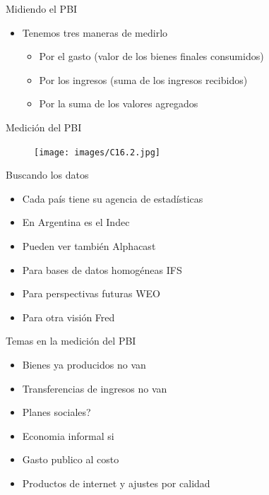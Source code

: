 \documentclass{beamer}
\begin{document}
\begin{frame}{Midiendo el PBI}
    \begin{itemize}
        \item Tenemos tres maneras de medirlo
       \begin{itemize}
           \item Por el gasto (valor de los bienes finales consumidos)
           \item Por los ingresos (suma de los ingresos recibidos)
           \item Por la suma de los valores agregados 
       \end{itemize}
    \end{itemize}
\end{frame}

\begin{frame}{Medición del PBI}
    \begin{figure} [H]   \texttt{[image: images/C16.2.jpg]}
\label{fig:25.2}
\end{figure}

\end{frame}



\begin{frame}{Buscando los datos}
    \begin{itemize}
        \item Cada país tiene su agencia de estadísticas
        \item En Argentina es el Indec
        \item Pueden ver también Alphacast
        \item Para bases de datos homogéneas IFS
        \item Para perspectivas futuras WEO
        \item Para otra visión Fred
        
    \end{itemize}
\end{frame}


\begin{frame}{Temas en la medición del PBI}
    \begin{itemize}
        \item Bienes ya producidos no van
        \item Transferencias de ingresos no van
        \item Planes sociales?
        \item Economia informal si
        \item Gasto publico al costo
        \item Productos de internet y ajustes por calidad
    \end{itemize}
\end{frame}
\end{document}
